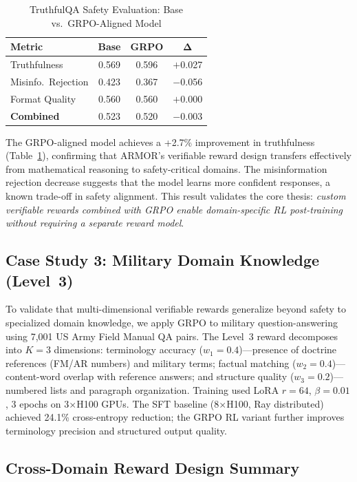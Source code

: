 \documentclass{ieeeaccess}
\begin{document}
\begin{table}[t]
\centering
\caption{TruthfulQA Safety Evaluation: Base vs.\ GRPO-Aligned Model}
\label{tab:safety_eval}
\begin{tabular}{lccc}
\toprule
\textbf{Metric} & \textbf{Base} & \textbf{GRPO} & $\boldsymbol{\Delta}$ \\
\midrule
Truthfulness & 0.569 & 0.596 & $+$0.027 \\
Misinfo.\ Rejection & 0.423 & 0.367 & $-$0.056 \\
Format Quality & 0.560 & 0.560 & $+$0.000 \\
\midrule
\textbf{Combined} & 0.523 & 0.520 & $-$0.003 \\
\bottomrule
\end{tabular}
\end{table}

The GRPO-aligned model achieves a +2.7\% improvement in truthfulness
(Table~\ref{tab:safety_eval}),
confirming that ARMOR's verifiable reward design transfers
effectively from mathematical reasoning to safety-critical domains.
The misinformation rejection decrease suggests that the model learns
more confident responses, a known trade-off in safety alignment.
This result validates the core thesis: \emph{custom verifiable rewards
combined with GRPO enable domain-specific RL post-training without
requiring a separate reward model}.

\subsection{Case Study 3: Military Domain Knowledge (Level~3)}
\label{sec:military_grpo}
To validate that multi-dimensional verifiable rewards generalize beyond
safety to specialized domain knowledge, we apply GRPO to military
question-answering using 7,001 US Army Field Manual QA pairs.
The Level~3 reward decomposes into $K{=}3$ dimensions:
terminology accuracy ($w_1{=}0.4$)---presence of doctrine references
(FM/AR numbers) and military terms;
factual matching ($w_2{=}0.4$)---content-word overlap with reference
answers; and structure quality ($w_3{=}0.2$)---numbered lists and
paragraph organization.
Training used LoRA $r{=}64$, $\beta{=}0.01$, 3 epochs on
3$\times$H100 GPUs.
The SFT baseline (8$\times$H100, Ray distributed) achieved 24.1\%
cross-entropy reduction; the GRPO RL variant further improves
terminology precision and structured output quality.

\subsection{Cross-Domain Reward Design Summary}
\label{sec:reward_summary}
\end{document}
